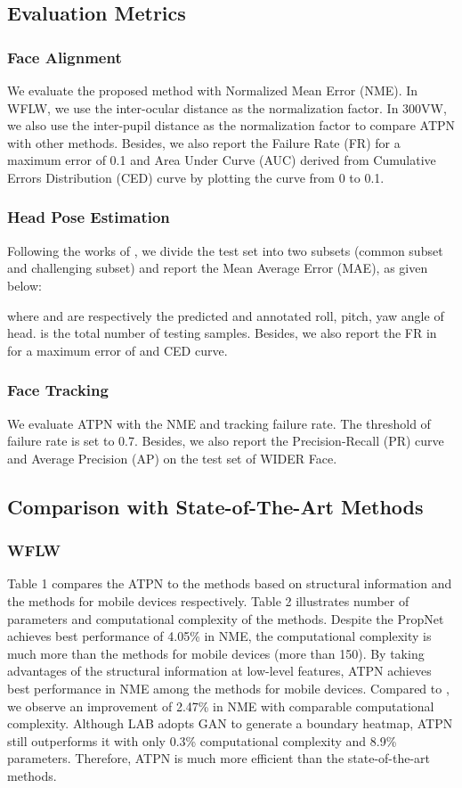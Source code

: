 \documentclass[3p,twocolumn, round, sort & compress]{elsarticle}
\begin{document}
\subsection{Evaluation Metrics}
\subsubsection{Face Alignment}
We evaluate the proposed method with Normalized Mean Error (NME). In WFLW, we use the inter-ocular distance \citep{300W} as the normalization factor. In 300VW, we also use the inter-pupil distance \citep{LAB} as the normalization factor to compare ATPN with other methods. Besides, we also report the Failure Rate (FR) for a maximum error of 0.1 and Area Under Curve (AUC) derived from Cumulative Errors Distribution (CED) curve by plotting the curve from 0 to 0.1.

\subsubsection{Head Pose Estimation}
Following the works of \citep{LAB,PropNet}, we divide the test set into two subsets (common subset and challenging subset) and report the Mean Average Error (MAE), as given below:

where  and  are respectively the predicted and annotated roll, pitch, yaw angle of head.  is the total number of testing samples. Besides, we also report the FR in for a maximum error of  and CED curve.
\subsubsection{Face Tracking}
We evaluate ATPN with the NME and tracking failure rate. The threshold of failure rate is set to 0.7. Besides, we also report the Precision-Recall (PR) curve and Average Precision (AP) on the test set of WIDER Face.


\subsection{Comparison with State-of-The-Art Methods}
\subsubsection{WFLW}
Table 1 compares the ATPN to the methods based on structural information and the methods for mobile devices respectively. Table 2 illustrates number of parameters and computational complexity of the methods. Despite the PropNet achieves best performance of 4.05\% in NME, the computational complexity is much more than the methods for mobile devices (more than 150). By taking advantages of the structural information at low-level features, ATPN achieves best performance in NME among the methods for mobile devices. Compared to , we observe an improvement of 2.47\% in NME with comparable computational complexity. Although LAB adopts GAN to generate a boundary heatmap, ATPN still outperforms it with only 0.3\% computational complexity and 8.9\% parameters. Therefore, ATPN is much more efficient than the state-of-the-art methods.
\end{document}
